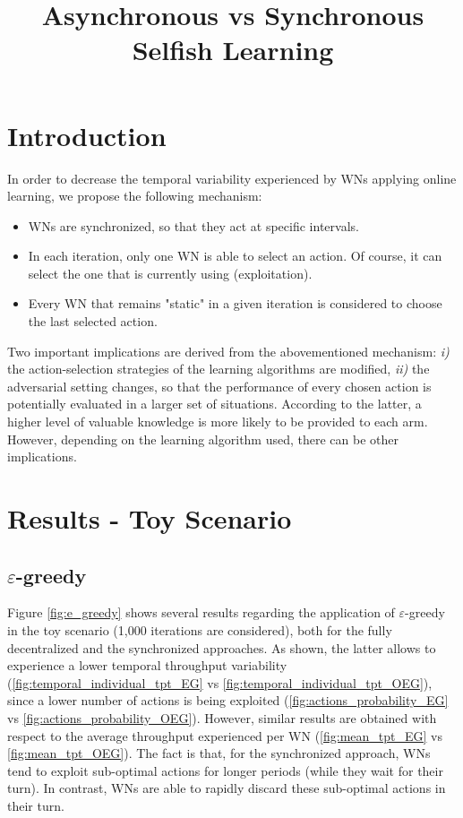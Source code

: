 \documentclass[preprint,12pt]{article}
\title{Asynchronous vs Synchronous Selfish Learning}
\begin{document}
\maketitle

\section{Introduction}
In order to decrease the temporal variability experienced by WNs applying online learning, we propose the following mechanism:
\begin{itemize}
	\item WNs are synchronized, so that they act at specific intervals.
	\item In each iteration, only one WN is able to select an action. Of course, it can select the one that is currently using (exploitation).
	\item Every WN that remains "static" in a given iteration is considered to choose the last selected action.
\end{itemize}

Two important implications are derived from the abovementioned mechanism: \emph{i)} the action-selection strategies of the learning algorithms are modified, \emph{ii)} the adversarial setting changes, so that the performance of every chosen action is potentially evaluated in a larger set of situations. According to the latter, a higher level of valuable knowledge is more likely to be provided to each arm. However, depending on the learning algorithm used, there can be other implications.
 
\section{Results - Toy Scenario}

\subsection{$\varepsilon$-greedy}
\label{section:e-greedy}

Figure \ref{fig:e_greedy} shows several results regarding the application of $\varepsilon$-greedy in the toy scenario (1,000 iterations are considered), both for the fully decentralized and the synchronized approaches. As shown, the latter allows to experience a lower temporal throughput variability (\ref{fig:temporal_individual_tpt_EG} vs \ref{fig:temporal_individual_tpt_OEG}), since a lower number of actions is being exploited (\ref{fig:actions_probability_EG} vs \ref{fig:actions_probability_OEG}). However, similar results are obtained with respect to the average throughput experienced per WN (\ref{fig:mean_tpt_EG} vs \ref{fig:mean_tpt_OEG}). The fact is that, for the synchronized approach, WNs tend to exploit sub-optimal actions for longer periods (while they wait for their turn). In contrast, WNs are able to rapidly discard these sub-optimal actions in their turn.
\end{document}
